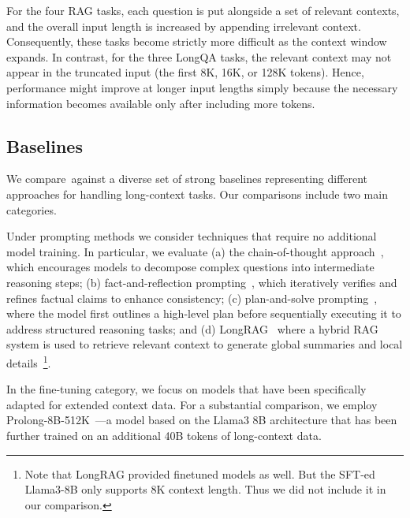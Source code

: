 For the four RAG tasks, each question is put alongside a set of relevant contexts, and the overall input length is increased by appending irrelevant context. Consequently, these tasks become strictly more difficult as the context window expands. 
In contrast, for the three LongQA tasks, the relevant context may not appear in the truncated input (the first 8K, 16K, or 128K tokens). Hence, performance might improve at longer input lengths simply because the necessary information becomes available only after including more tokens.


\subsection{Baselines} 

We compare~\method against a diverse set of strong baselines representing different approaches for handling long-context tasks. Our comparisons include two main categories. 

Under prompting methods we consider techniques that require no additional model training. In particular, we evaluate (a) the chain-of-thought approach~\cite{kojima2022large}, which encourages models to decompose complex questions into intermediate reasoning steps; (b) fact-and-reflection prompting~\cite{zhao-etal-2024-fact}, which iteratively verifies and refines factual claims to enhance consistency; (c) plan-and-solve prompting~\cite{wang2023plan}, where the model first outlines a high-level plan before sequentially executing it to address structured reasoning tasks; and (d) LongRAG~\cite{zhao-etal-2024-longrag} where a hybrid RAG system is used to retrieve relevant context to generate global summaries and local details~\footnote{Note that LongRAG provided finetuned models as well. But the SFT-ed Llama3-8B only supports 8K context length. Thus we did not include it in our comparison.}. 

In the fine-tuning category, we focus on models that have been specifically adapted for extended context data. For a substantial comparison, we employ Prolong-8B-512K~\cite{prolong}—a model based on the Llama3 8B architecture that has been further trained on an additional 40B tokens of long-context data.


